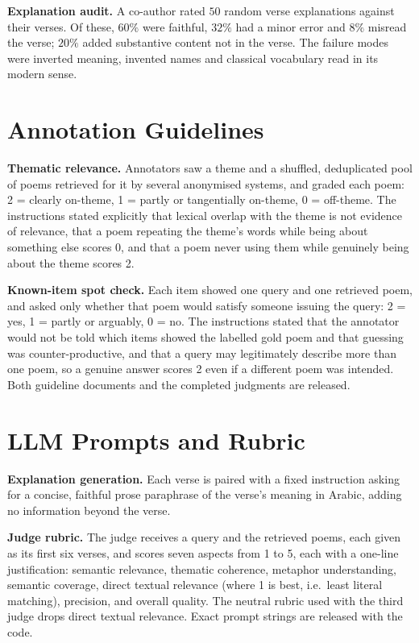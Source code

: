 \documentclass[11pt]{article}
\begin{document}
\textbf{Explanation audit.} A co-author rated $50$ random verse explanations against their verses. Of these, $60\%$ were faithful, $32\%$ had a minor error and $8\%$ misread the verse; $20\%$ added substantive content not in the verse. The failure modes were inverted meaning, invented names and classical vocabulary read in its modern sense.

\section{Annotation Guidelines}
\label{app:annot}
\textbf{Thematic relevance.} Annotators saw a theme and a shuffled, deduplicated pool of poems retrieved for it by several anonymised systems, and graded each poem: 2 = clearly on-theme, 1 = partly or tangentially on-theme, 0 = off-theme. The instructions stated explicitly that lexical overlap with the theme is not evidence of relevance, that a poem repeating the theme's words while being about something else scores 0, and that a poem never using them while genuinely being about the theme scores 2.

\textbf{Known-item spot check.} Each item showed one query and one retrieved poem, and asked only whether that poem would satisfy someone issuing the query: 2 = yes, 1 = partly or arguably, 0 = no. The instructions stated that the annotator would not be told which items showed the labelled gold poem and that guessing was counter-productive, and that a query may legitimately describe more than one poem, so a genuine answer scores 2 even if a different poem was intended. Both guideline documents and the completed judgments are released.

\section{LLM Prompts and Rubric}
\label{app:prompts}
\textbf{Explanation generation.} Each verse is paired with a fixed instruction asking for a concise, faithful prose paraphrase of the verse's meaning in Arabic, adding no information beyond the verse.

\textbf{Judge rubric.} The judge receives a query and the retrieved poems, each given as its first six verses, and scores seven aspects from 1 to 5, each with a one-line justification: semantic relevance, thematic coherence, metaphor understanding, semantic coverage, direct textual relevance (where 1 is best, i.e.\ least literal matching), precision, and overall quality. The neutral rubric used with the third judge drops direct textual relevance. Exact prompt strings are released with the code.
\end{document}
